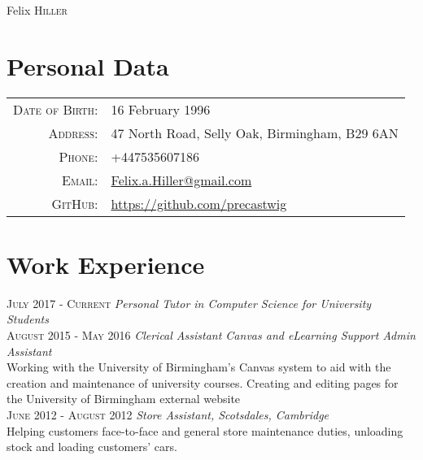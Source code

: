 \documentclass[a4paper, 10pt]{article}
\begin{document}
\pagestyle{empty}

\par{\centering
		{\Huge Felix \textsc{Hiller}
	}\bigskip\par}

\section{Personal Data}

\begin{tabular}{rl}
    \textsc{Date of Birth:} & 16 February 1996\\
    \textsc{Address:}   & 47 North Road, Selly Oak, Birmingham, B29 6AN\\
    \textsc{Phone:}     & +447535607186\\
    \textsc{Email:}     & \href{mailto:felix.a.hiller@gmail.com}{Felix.a.Hiller@gmail.com}\\
	\textsc{GitHub:}	& \url{https://github.com/precastwig}
\end{tabular}

\section{Work Experience}

 \textsc{July 2017 - Current} \emph{Personal Tutor in Computer Science for University Students}\\
 \textsc{August 2015 - May 2016} \emph{Clerical Assistant Canvas and eLearning Support Admin Assistant}\\
 \footnotesize{Working with the University of Birmingham's Canvas system to aid with the creation and maintenance of university courses. Creating and editing pages for the University of Birmingham external website}\\
 \normalsize\textsc{June 2012 - August 2012} \emph{Store Assistant, Scotsdales, Cambridge}\\
 \footnotesize{Helping customers face-to-face and general store maintenance duties, unloading stock and loading customers' cars.}
\normalsize
\end{document}
